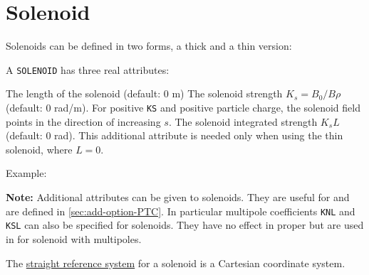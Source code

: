 


\section{Solenoid}
\label{sec:solenoid}

Solenoids can be defined in two forms, a thick and a thin version:


A \texttt{SOLENOID} has three real attributes:
\begin{madlist}
    The length of the solenoid (default: 0 m)
    The solenoid strength $K_s = B_0 / B\rho$ (default: 0
     rad/m). For positive \texttt{KS} and positive particle charge, the
     solenoid field points in the direction of increasing $s$.
    The solenoid integrated strength $K_s L$
     (default: 0 rad).  This additional attribute is needed only when
     using the thin solenoid,  where $L=0$.
\end{madlist}

Example:

\textbf{Note:} Additional attributes can be given to solenoids. They
are useful for \ptc and are defined in \ref{sec:add-option-PTC}.
In particular multipole coefficients \texttt{KNL} and \texttt{KSL} can
also be specified for solenoids. They have no effect in \madx proper but
are used in \ptc for solenoid with multipoles.

The \hyperref[subsec:local-straight]{straight reference system} for a
solenoid is a Cartesian coordinate system.



